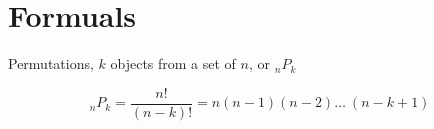 \documentclass{article}
\begin{document}
\section{Formuals}

Permutations, $k$ objects from a set of $n$, or $_{n}P_{k}$

\begin{equation}
   _{n}P_{k} = \frac{n!}{(n - k)!} = n(n-1)(n-2)\ldots\ (n-k+1)
\end{equation}
\end{document}
